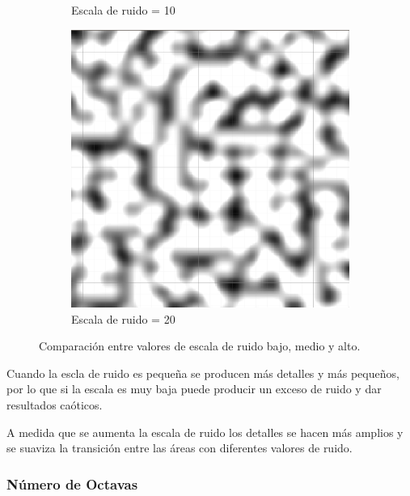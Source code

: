 \begin{figure}[ht]
\begin{subfigure}{0.3\linewidth}
        \caption{Escala de ruido = 10 }
    \end{subfigure}
    \hfill
    \begin{subfigure}{0.3\linewidth}
        \centering
        \includegraphics[width=\linewidth]{img/codes/HightNoiseScale.png}
        \caption{Escala de ruido = 20}
    \end{subfigure}
    \caption{Comparación entre valores de escala de ruido bajo, medio y alto.}
\end{figure}

Cuando la escla de ruido es pequeña se producen más detalles y más pequeños, por lo que si la escala es muy baja puede producir un exceso de ruido y dar resultados caóticos.

A medida que se aumenta la escala de ruido los detalles se hacen más amplios y se suaviza la transición entre las áreas con diferentes valores de ruido.


\subsubsection{Número de Octavas}

